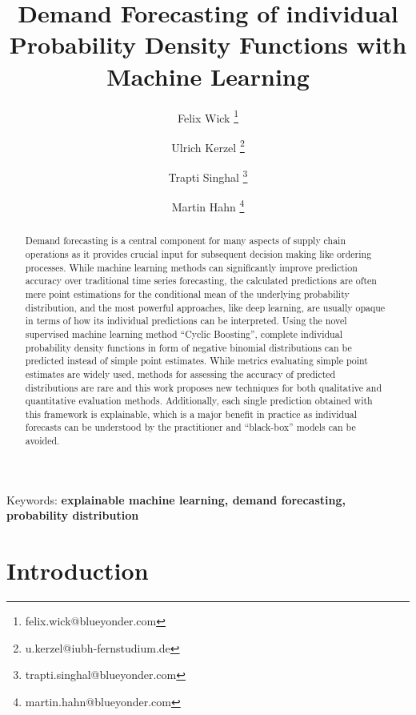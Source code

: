 \documentclass[BCOR=1mm, DIV=calc,10pt,
twoside=true,
twocolumn,
headings=normal]{scrartcl}
\begin{document}
\title{Demand Forecasting of individual Probability Density Functions with Machine Learning}

\author[1]{Felix Wick \thanks{felix.wick@blueyonder.com}}
\author[2]{Ulrich Kerzel \thanks{u.kerzel@iubh-fernstudium.de}}
\author[1]{Trapti Singhal \thanks{trapti.singhal@blueyonder.com}}
\author[1]{Martin Hahn \thanks{martin.hahn@blueyonder.com}}


\date{}

\maketitle

\begin{abstract}
Demand forecasting is a central component for many aspects of supply chain operations as it provides crucial input for subsequent decision making like ordering processes. While machine learning methods can significantly improve prediction accuracy over traditional time series forecasting, the calculated predictions are often mere point estimations for the conditional mean of the underlying probability distribution, and the most powerful approaches, like deep learning, are usually opaque in terms of how its individual predictions can be interpreted. Using the novel supervised machine learning method ``Cyclic Boosting'', complete individual probability density functions in form of negative binomial distributions can be predicted instead of simple point estimates. While metrics evaluating simple point estimates are widely used, methods for assessing the accuracy of predicted distributions are rare and this work proposes new techniques for both qualitative and quantitative evaluation methods. Additionally, each single prediction obtained with this framework is explainable, which is a major benefit in practice as individual forecasts can be understood by the practitioner and ``black-box'' models can be avoided. 
\end{abstract}

{Keywords: \textbf{explainable machine learning, demand forecasting, probability distribution}}


\section{Introduction}
\end{document}
